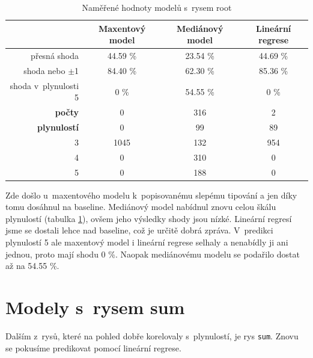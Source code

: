\documentclass[12pt,a4paper]{report}
\begin{document}
\begin{table}[!htbp]
\begin{center}
\begin{tabular}{|r|c|c|c|}
\hline
 & \textbf{\scriptsize{ Maxentový model}} & \textbf{\scriptsize Mediánový model} & \textbf{\scriptsize Lineární regrese} \\
 \hline
  {\small přesná shoda} & 44.59 \%  & 23.54 \%  & 44.69 \% \\
\hline
{\small shoda nebo $\pm$1} & 84.40 \% & 62.30 \% & 85.36 \% \\
\hline
{\small shoda v~plynulosti 5} & \color{red}0 \% & 54.55 \% &\color{red} 0 \% \\
\hline
     \textbf{\small počty} \quad 1 & \color{red}0   & 316  & 2 \\
\textbf{\small plynulostí} \quad 2 & \color{red}0 & 99 & 89 \\
                          3 & 1045 & 132 & 954 \\
                          4 & \color{red}0   & 310 & \color{red}0\\
                          5 & \color{red}0   & 188 & \color{red}0 \\
\hline
\end{tabular}
\caption{Naměřené hodnoty modelů s~rysem root}\label{tb:root}
\end{center}
\end{table}

Zde došlo u~maxentového modelu k~popisovanému slepému tipování a jen díky tomu dosáhnul na baseline. Mediánový model nabídnul znovu celou škálu plynulostí (tabulka \ref{tb:root}), ovšem jeho výsledky shody jsou nízké. Lineární regresí jsme se dostali lehce nad baseline, což je určitě dobrá zpráva. V~predikci plynulostí 5 ale maxentový model i lineární regrese selhaly a nenabídly ji ani jednou, proto mají shodu 0 \%. Naopak mediánovému modelu se podařilo dostat až na 54.55 \%.

\section{Modely s~rysem sum}
Dalším z~rysů, které na pohled dobře korelovaly s~plynulostí, je rys \texttt{sum}. Znovu se pokusíme predikovat pomocí lineární regrese.
\end{document}
